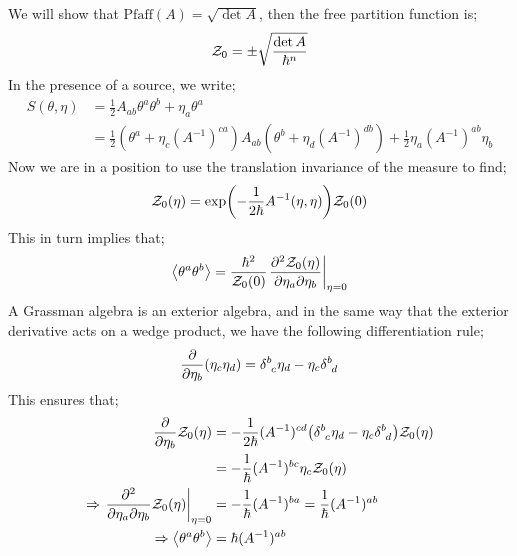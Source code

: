 We will show that $\text{Pfaff}(A) = \sqrt{\det A}$, then the free partition function is;
\begin{equation}
\mathcal{Z}_0 = \pm \sqrt{\frac{\det A}{\hbar^{n}}}
\end{equation}
In the presence of a source, we write;
\begin{align*}
S(\theta, \eta) &= \tfrac{1}{2}A_{ab}\theta^{a}\theta^{b} + \eta_a \theta^{a} \\
&= \tfrac{1}{2}\left(\theta^a + \eta_c \left(A^{-1}\right)^{ca}\right)A_{ab}\left(\theta^b + \eta_d \left(A^{-1}\right)^{db}\right) + \tfrac{1}{2}\eta_a\left(A^{-1}\right)^{ab} \eta_b
\end{align*}
Now we are in a position to use the translation invariance of the measure to find;
\begin{equation}
\mZ_0(\eta) = \exp\left(-\frac{1}{2\hbar}A^{-1}(\eta, \eta)\right)\mZ_0(0)
\end{equation}
This in turn implies that;
\begin{equation*}
\left< \theta^a \theta^b \right> = \frac{\hbar^2}{\mZ_0(0)}\left.\frac{\del^2 \mZ_0(\eta)}{\del \eta_a \del \eta_b}\right|_{\eta = 0}
\end{equation*}
A Grassman algebra is an exterior algebra, and in the same way that the exterior derivative acts on a wedge product, we have the following differentiation rule;
\begin{equation*}
\frac{\del}{\del \eta_b}\left(\eta_c \eta_d\right) = \delta\indices{^{b}_{c}}\eta_d - \eta_c\delta\indices{^{b}_{d}}
\end{equation*}
This ensures that;
\begin{align*}
\frac{\del}{\del \eta_b}\mZ_0(\eta) &= -\frac{1}{2\hbar}(A^{-1})^{cd}\left(\delta\indices{^{b}_{c}}\eta_d - \eta_c\delta\indices{^{b}_{d}}\right)\mZ_0(\eta) \\
&= -\frac{1}{\hbar}(A^{-1})^{bc}\eta_c \mZ_0(\eta) \\
\Rightarrow \left.\frac{\del^2}{\del \eta_a \del \eta_b}\mZ_0(\eta)\right|_{\eta = 0} &= -\frac{1}{\hbar}(A^{-1})^{ba} = \frac{1}{\hbar}(A^{-1})^{ab} \\
\Rightarrow \left< \theta^a \theta^b \right> &= \hbar (A^{-1})^{ab}
\end{align*}
